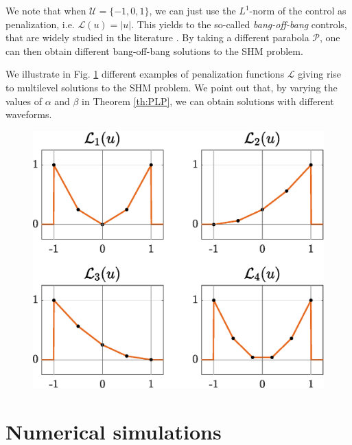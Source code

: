 \documentclass[9pt,shortpaper,twoside,web]{ieeecolor}
\begin{document}
\begin{remark}
	We note that when  $\mathcal{U}= \{-1,0,1\}$, we can just use the $L^1$-norm of the control as penalization, i.e. $\mathcal{L}(u) = |u|$. This yields to the so-called \emph{bang-off-bang} controls, that are widely studied in the literature \cite{nagahara2013maximum,ikeda2016maximum}. By taking a different parabola $\mathcal{P}$, one can then obtain different bang-off-bang solutions to the SHM problem.
\end{remark}

We illustrate in Fig. \ref{fig:examples_penalizations} different examples of penalization functions $\mathcal{L}$ giving rise to multilevel solutions to the SHM problem. We point out that, by varying the values of $\alpha$ and $\beta$ in Theorem \ref{th:PLP}, we can obtain solutions with different waveforms.


\begin{figure}
	\centering
	\includegraphics[scale=0.45]{img/fig11.eps}
	\caption{ }
	\label{fig:examples_penalizations}
\end{figure}

\section{Numerical simulations}\label{sec:Simulations}
\end{document}
